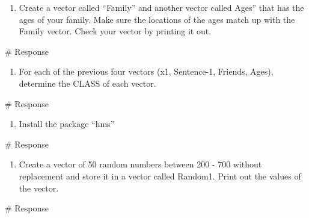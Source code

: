 \documentclass[
  letterpaper,
  DIV=11,
  numbers=noendperiod]{scrreprt}
\newenvironment{Shaded}{\begin{snugshade}}{\end{snugshade}}
\newcommand{\CommentTok}[1]{\textcolor[rgb]{0.37,0.37,0.37}{#1}}
\providecommand{\tightlist}{%
  \setlength{\itemsep}{0pt}\setlength{\parskip}{0pt}}\usepackage{longtable,booktabs,array}
\begin{document}
\begin{enumerate}
\def\labelenumi{\arabic{enumi}.}
\setcounter{enumi}{4}
\tightlist
\item
  Create a vector called ``Family'' and another vector called Ages''
  that has the ages of your family. Make sure the locations of the ages
  match up with the Family vector. Check your vector by printing it out.
\end{enumerate}

\begin{Shaded}
\begin{Highlighting}[]
\CommentTok{\# Response}
\end{Highlighting}
\end{Shaded}

\begin{enumerate}
\def\labelenumi{\arabic{enumi}.}
\setcounter{enumi}{5}
\tightlist
\item
  For each of the previous four vectors (x1, Sentence-1, Friends, Ages),
  determine the CLASS of each vector.
\end{enumerate}

\begin{Shaded}
\begin{Highlighting}[]
\CommentTok{\# Response}
\end{Highlighting}
\end{Shaded}

\begin{enumerate}
\def\labelenumi{\arabic{enumi}.}
\setcounter{enumi}{6}
\tightlist
\item
  Install the package ``hms''
\end{enumerate}

\begin{Shaded}
\begin{Highlighting}[]
\CommentTok{\# Response}
\end{Highlighting}
\end{Shaded}

\begin{enumerate}
\def\labelenumi{\arabic{enumi}.}
\setcounter{enumi}{7}
\tightlist
\item
  Create a vector of 50 random numbers between 200 - 700 without
  replacement and store it in a vector called Random1. Print out the
  values of the vector.
\end{enumerate}

\begin{Shaded}
\begin{Highlighting}[]
\CommentTok{\# Response}
\end{Highlighting}
\end{Shaded}
\end{document}

